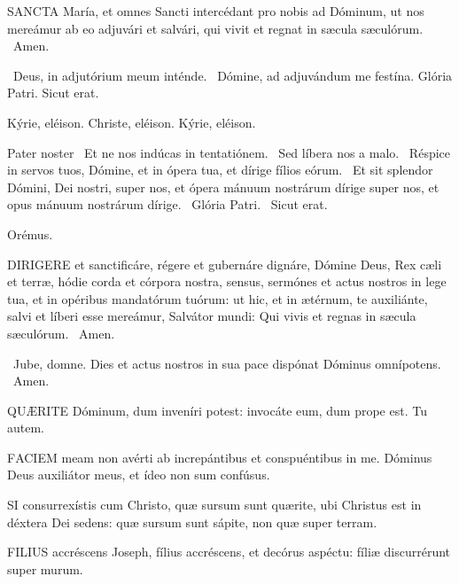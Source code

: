 
\lettrine[lines=2]{S}{ANCTA} María, et omnes Sancti intercédant pro nobis ad Dóminum, ut nos mereámur ab eo adjuvári et salvári, qui vivit et regnat in sæcula sæculórum. \R\ Amen.

\V\ Deus, in adjutórium meum inténde. \R\ Dómine, ad adjuvándum me festína.  Glória Patri. Sicut erat.

Kýrie, eléison. Christe, eléison. Kýrie, eléison.

Pater noster  \V\ Et ne nos indúcas in tentatiónem. \R\ Sed líbera nos a malo. \V\ Réspice in servos tuos, Dómine, et in ópera tua, et dírige fílios eórum. \R\ Et sit splendor Dómini, Dei nostri, super nos, et ópera mánuum nostrárum dírige super nos, et opus mánuum nostrárum dírige. \V\ Glória Patri. \R\ Sicut erat.

Orémus. 

\lettrine[lines=2]{D}{IRIGERE} et sanctificáre, régere et gubernáre dignáre, Dómine Deus, Rex cæli et terræ, hódie corda et córpora nostra, sensus, sermónes et actus nostros in lege tua, et in opéribus mandatórum tuórum: ut hic, et in ætérnum, te auxiliánte, salvi et líberi esse mereámur, Salvátor mundi: Qui vivis et regnas in sæcula sæculórum. \R\ Amen.

\V\ Jube, domne.  Dies et actus nostros in sua pace dispónat Dóminus omnípotens. \R\ Amen.



\lettrine[lines=2]{Q}{UÆRITE} Dóminum, dum inveníri potest: invocáte eum, dum prope est. Tu autem.


\lettrine[lines=2]{F}{ACIEM} meam non avérti ab increpántibus et conspuéntibus in me. Dóminus Deus auxiliátor meus, et ídeo non sum confúsus.


\lettrine[lines=2]{S}{I} consurrexístis cum Christo, quæ sursum sunt quærite, ubi Christus est in déxtera Dei sedens: quæ sursum sunt sápite, non quæ super terram.



\lettrine[lines=2]{F}{ILIUS} accréscens Joseph, fílius accréscens, et decórus aspéctu: fíliæ discurrérunt super murum.

